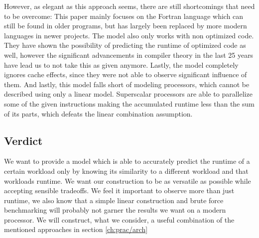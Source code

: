 \documentclass[../bachelor_paper.tex]{subfiles}
\begin{document}
However, as elegant as this approach seems, there are still shortcomings that need to be overcome: This paper mainly focuses on the Fortran language which can still be found in older programs, but has largely been replaced by more modern languages in newer projects. The model also only works with non optimized code. They have shown the possibility of predicting the runtime of optimized code as well, however the significant advancements in compiler theory in the last 25 years have lead us to not take this as given anymore. Lastly, the model completely ignores cache effects, since they were not able to observe significant influence of them. And lastly, this model falls short of modeling processors, which cannot be described using only a linear model. Superscalar processors are able to parallelize some of the given instructions making the accumulated runtime less than the sum of its parts, which defeats the linear combination assumption.

\subsection{Verdict}
	\label{ch:theo/simi/verd}
We want to provide a model which is able to accurately predict the runtime of a certain workload only by knowing its similarity to a different workload and that workloads runtime. We want our construction to be as versatile as possible while accepting sensible tradeoffs. We feel it important to observe more than just runtime, we also know that a simple linear construction and brute force benchmarking will probably not garner the results we want on a modern processor. We will construct, what we consider, a useful combination of the mentioned approaches in section \ref{ch:prac/arch}



\isstandalone



\fi
\end{document}
